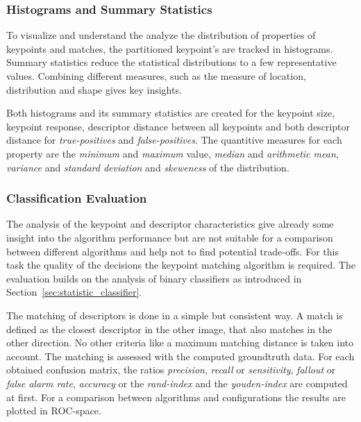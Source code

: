 \subsubsection{Histograms and Summary Statistics}

To visualize and understand the analyze the distribution of properties of keypoints and matches, the partitioned keypoint's are tracked in histograms.
Summary statistics reduce the statistical distributions to a few representative values.
Combining different measures, such as the measure of location, distribution and shape gives key insights.

Both histograms and its summary statistics are created for the keypoint size, keypoint response, descriptor distance between all keypoints and both descriptor distance for \emph{true-positives} and \emph{false-positives}.
The quantitive measures for each property are the \emph{minimum} and \emph{maximum} value, \emph{median} and \emph{arithmetic mean}, \emph{variance} and \emph{standard deviation} and \emph{skeweness} of the distribution.

\subsubsection{Classification Evaluation}

The analysis of the keypoint and descriptor characteristics give already some insight into the algorithm performance but are not suitable for a comparison between different algorithms and help not to find potential trade-offs.
For this task the quality of the decisions the keypoint matching algorithm is required.
The evaluation builds on the analysis of binary classifiers as introduced in Section~\ref{sec:statistic_classifier}.

The matching of descriptors is done in a simple but consistent way.
A match is defined as the closest descriptor in the other image, that also matches in the other direction.
No other criteria like a maximum matching distance is taken into account.
The matching is assessed with the computed groundtruth data.
For each obtained confusion matrix, the ratios \emph{precision}, \emph{recall} or \emph{sensitivity}, \emph{fallout} or \emph{false alarm rate}, \emph{accuracy} or the \emph{rand-index} and the \emph{youden-index} are computed at first.
For a comparison between algorithms and configurations the results are plotted in \gls{ROC}-space.
